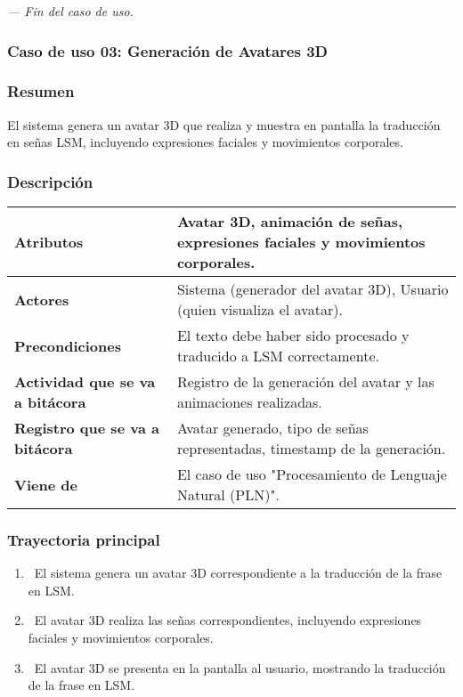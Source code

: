 \textit{--- Fin del caso de uso.}
\newpage
\subsubsection{Caso de uso 03: Generación de Avatares 3D}
\subsubsection{Resumen}
El sistema genera un avatar 3D que realiza y muestra en pantalla la traducción en señas LSM, incluyendo expresiones faciales y movimientos corporales.
\subsubsection{Descripción}
\begin{table}[h]
    \centering
    \begin{longtable}{|l|p{10cm}|}  %
    \hline
    \textbf{Atributos} & Avatar 3D, animación de señas, expresiones faciales y movimientos corporales. \\ \hline
    \textbf{Actores} & Sistema (generador del avatar 3D), Usuario (quien visualiza el avatar). \\ \hline
    \textbf{Precondiciones} & El texto debe haber sido procesado y traducido a LSM correctamente. \\ \hline
    \textbf{Actividad que se va a bitácora} & Registro de la generación del avatar y las animaciones realizadas. \\ \hline
    \textbf{Registro que se va a bitácora} & Avatar generado, tipo de señas representadas, timestamp de la generación. \\ \hline
    \textbf{Viene de} & El caso de uso "Procesamiento de Lenguaje Natural (PLN)". \\ \hline
       
    \end{longtable}
\end{table}
    
\subsubsection{Trayectoria principal}
\begin{enumerate}[label=\textbf{\arabic*}, leftmargin=1.5cm]
    \item \UCsystem \ El sistema genera un avatar 3D correspondiente a la traducción de la frase en LSM.
    
    \item \UCsystem \ El avatar 3D realiza las señas correspondientes, incluyendo expresiones faciales y movimientos corporales.

    \item \UCsystem \ El avatar 3D se presenta en la pantalla al usuario, mostrando la traducción de la frase en LSM.

\end{enumerate}

